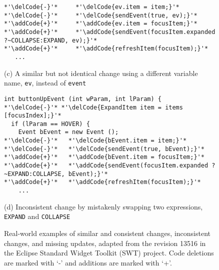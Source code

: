 \begin{figure*}[!t]
\begin{lstlisting}[style=MyJavaSmallStyle]
*'\delCode{-}'*     *'\delCode{ev.item = item;}'*
*'\delCode{-}'*     *'\delCode{sendEvent(true, ev);}'*
*'\addCode{+}'*     *'\addCode{ev.item = focusItem;}'*
*'\addCode{+}'*     *'\addCode{sendEvent(focusItem.expanded ?~COLLAPSE:EXPAND, ev);}'*
*'\addCode{+}'*     *'\addCode{refreshItem(focusItem);}'*
   ...
\end{lstlisting}
\vspace{-0.7cm}
\begin{center}\begin{scriptsize}(c) A similar but not identical change using a different variable name, \texttt{ev}, instead of {\tt event}\end{scriptsize}\end{center}
\vspace{-0.4cm}
%
\begin{lstlisting}[style=MyJavaSmallStyle]
int buttonUpEvent (int wParam, int lParam) {
*'\delCode{-}'* *'\delCode{ExpandItem item = items [focusIndex];}'*
  if (lParam == HOVER) {
    Event bEvent = new Event ();
*'\delCode{-}'*   *'\delCode{bEvent.item = item;}'*
*'\delCode{-}'*   *'\delCode{sendEvent(true, bEvent);}'*
*'\addCode{+}'*   *'\addCode{bEvent.item = focusItem;}'*
*'\addCode{+}'*   *'\addCode{sendEvent(focusItem.expanded ?~EXPAND:COLLAPSE, bEvent);}'*
*'\addCode{+}'*   *'\addCode{refreshItem(focusItem);}'*
    ...
\end{lstlisting}
\vspace{-0.7cm}
\begin{center}\begin{scriptsize}(d) Inconsistent change by mistakenly swapping two expressions, {\tt EXPAND} and {\tt COLLAPSE}\end{scriptsize}\end{center}
\vspace{-0.4cm}
\caption{Real-world examples of similar and consistent changes, inconsistent changes, and missing updates, adapted from the revision 13516 in the Eclipse Standard Widget Toolkit (SWT) project. Code deletions are marked with `-' and additions are marked with `+'.}
\label{fig:critics-example}
\end{figure*}
